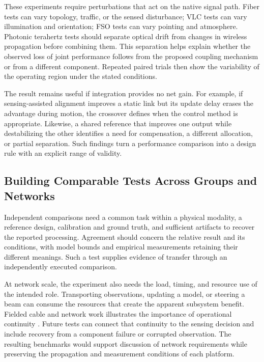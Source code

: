 These experiments require perturbations that act on the native signal path.
Fiber tests can vary topology, traffic, or the sensed disturbance; VLC tests
can vary illumination and orientation; FSO tests can vary pointing and
atmosphere. Photonic terahertz tests should separate optical drift from changes
in wireless propagation before combining them. This separation helps explain
whether the observed loss of joint performance follows from the proposed
coupling mechanism or from a different component. Repeated paired trials
then show the variability of the operating region under the stated conditions.

The result remains useful if integration provides no net gain. For example,
if sensing-assisted alignment improves a static link but its update delay
erases the advantage during motion, the crossover defines when the control
method is appropriate. Likewise, a shared reference that improves one output
while destabilizing the other identifies a need for compensation, a different
allocation, or partial separation. Such findings turn a performance comparison
into a design rule with an explicit range of validity.

\subsection{Building Comparable Tests Across Groups and Networks}

Independent comparisons need a common task within a physical modality, a
reference design, calibration and ground truth, and sufficient artifacts to
recover the reported processing. Agreement should concern the relative result
and its conditions, with model bounds and empirical measurements retaining
their different meanings. Such a test supplies evidence of transfer through
an independently executed comparison.

At network scale, the experiment also needs the load, timing, and resource
use of the intended role. Transporting observations, updating a model, or
steering a beam can consume the resources that create the apparent subsystem
benefit. Fielded cable and network work illustrates the importance of
operational continuity \cite{Cao2026SubmarineFiberISAC,Ip2026DeployedTelecomCableISAC}.
Future tests can connect that continuity to the sensing decision and include
recovery from a component failure or corrupted observation. The resulting
benchmarks would support discussion of network requirements while preserving
the propagation and measurement conditions of each platform.

